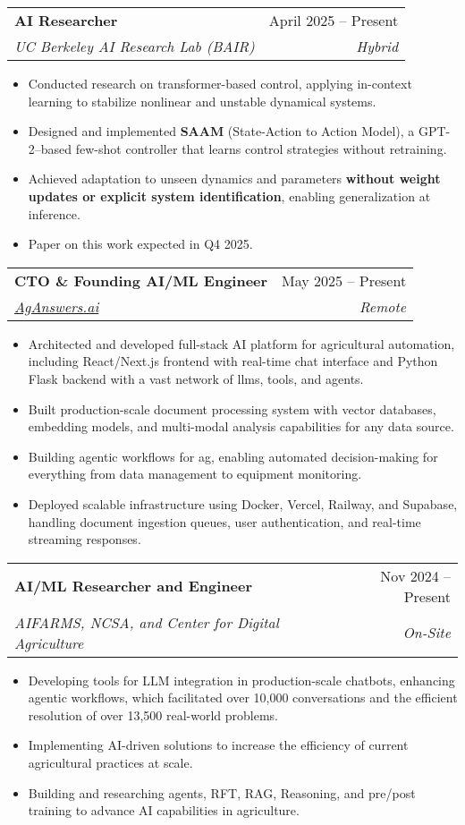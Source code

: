 \documentclass[letterpaper,10.99999999999999pt]{article}
\makeatletter
\newcommand{\resumeItem}[1]{
  \item\small{
    {#1 \vspace{-1pt}}
  }
}
\newcommand{\resumeSubheading}[4]{
  \vspace{-1pt}\item
    \begin{tabular*}{0.97\textwidth}[t]{l@{\extracolsep{\fill}}r}
      \textbf{#1} & #2 \\
      \textit{\small#3} & \textit{\small #4} \\
    \end{tabular*}\vspace{-6pt}
}
\newcommand{\resumeItemListStart}{\begin{itemize}}
\newcommand{\resumeItemListEnd}{\end{itemize}\vspace{-5pt}}
\makeatother
\begin{document}
  \resumeSubheading
    {AI Researcher}{April 2025 – Present}
    {UC Berkeley AI Research Lab (BAIR)}{Hybrid}
    \resumeItemListStart
      \resumeItem{Conducted research on transformer-based control, applying in-context learning to stabilize nonlinear and unstable dynamical systems.}
      \resumeItem{Designed and implemented \textbf{SAAM} (State-Action to Action Model), a GPT-2–based few-shot controller that learns control strategies without retraining.}
      \resumeItem{Achieved adaptation to unseen dynamics and parameters \textbf{without weight updates or explicit system identification}, enabling generalization at inference.}
      \resumeItem{Paper on this work expected in Q4 2025.}
    \resumeItemListEnd


  \resumeSubheading
      {CTO \& Founding AI/ML Engineer}{May 2025 – Present}
      {\href{https://aganswers.ai/}{AgAnswers.ai}}{Remote}
      \resumeItemListStart
        \resumeItem{Architected and developed full-stack AI platform for agricultural automation, including React/Next.js frontend with real-time chat interface and Python Flask backend with a vast network of llms, tools, and agents.}
        \resumeItem{Built production-scale document processing system with vector databases, embedding models, and multi-modal analysis capabilities for any data source.}
        \resumeItem{Building agentic workflows for ag, enabling automated decision-making for everything from data management to equipment monitoring.}
        \resumeItem{Deployed scalable infrastructure using Docker, Vercel, Railway, and Supabase, handling document ingestion queues, user authentication, and real-time streaming responses.}
      \resumeItemListEnd

  \resumeSubheading
      {AI/ML Researcher and Engineer}{Nov 2024 – Present}
      {AIFARMS, NCSA, and Center for Digital Agriculture}{On-Site}
      \resumeItemListStart
        \resumeItem{Developing tools for LLM integration in production-scale chatbots, enhancing agentic workflows, which facilitated over 10,000 conversations and the efficient resolution of over 13,500 real-world problems.}
        \resumeItem{Implementing AI-driven solutions to increase the efficiency of current agricultural practices at scale.}
        \resumeItem{Building and researching agents, RFT, RAG, Reasoning, and pre/post training to advance AI capabilities in agriculture.}
      \resumeItemListEnd
\end{document}
